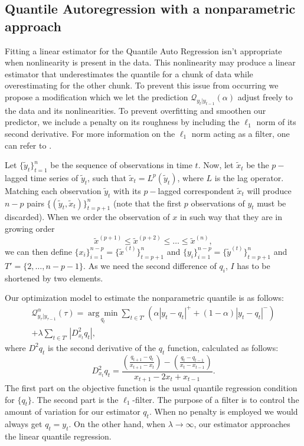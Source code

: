 \subsection{Quantile Autoregression with a nonparametric approach}
\label{sec:npqar}

Fitting a linear estimator for the Quantile Auto Regression isn't appropriate  when nonlinearity is present in the data. This nonlinearity may produce a linear estimator that underestimates the quantile for a chunk of data while overestimating for the other chunk. To prevent this issue from occurring we propose a modification which we let the prediction $\mathcal{Q}_{y_t|y_{t-1}}(\alpha)$ adjust freely to the data and its nonlinearities. To prevent overfitting and smoothen our predictor, we include a penalty on its roughness by including the $\ell_1$ norm of its second derivative. For more information on the $\ell_1$ norm acting as a filter, one can refer to \cite{kim2009ell_1}.




Let $\{\tilde{y}_t \}_{t=1}^n$ be the sequence of observations in time $t$. Now, let $\tilde{x}_t$ be the $p-$lagged time series of $\tilde{y}_t$, such that $\tilde{x}_t = L^p(\tilde{y}_t)$, where $L$ is the lag operator. Matching each observation $\tilde{y}_t$ with its $p-$lagged correspondent $\tilde{x}_t$ will produce $n-p$ pairs $\{(\tilde{y}_t,\tilde{x}_t)\}_{t=p+1}^n$ (note that the first $p$ observations of $y_t$ must be discarded). When we order the observation of $x$ in such way that they are in growing order
$$\tilde{x}^{(p+1)} \leq \tilde{x}^{(p+2)} \leq \dots \leq \tilde{x}^{(n)},$$ 
we can then define $\{x_i\}_{i=1}^{n-p} = \{\tilde{x}^{(t)} \}_{t=p+1}^{n}$ and $\{y_i\}_{i=1}^{n-p} = \{\tilde{y}^{(t)} \}_{t=p+1}^{n}$ and $T' = \{2,\dots, n-p-1\}$. As we need the second difference of $q_i$, $I$ has to be shortened by two elements.


Our optimization model to estimate the nonparametric quantile is as follows:
\begin{equation}
\begin{split}
\mathcal{Q}_{y_\tau|y_{\tau-1}}^\alpha(\tau) =\underset{q_{t}}{\arg\min}\sum_{t\in T'} \left( \alpha |y_{t}-q_{t}|^{+} + (1-\alpha)|y_{t}-q_{t}|^{-}\right) \\ +\lambda  \sum_{t\in T'}|D_{x_t}^{2}q_{t}|,
\end{split}
\end{equation}
where $D^2 q_t$ is the second derivative of the $q_t$ function, calculated as follows:
\begin{equation*}
D_{x_{t}}^{2}q_{t}=\frac{\left(\frac{q_{t+1}-q_{t}}{x_{t+1}-x_{t}}\right)-\left(\frac{q_{t}-q_{t-1}}{x_{t}-x_{t-1}}\right)}{x_{t+1}-2x_{t} + x_{t-1}}.
\end{equation*}
The first part on the objective function is the usual quantile regression condition for $\{q_t\}$. The second part is the $\ell_1$-filter. The purpose of a filter is to control the amount of variation for our estimator $q_t$. When no penalty is employed we would always get $q_t = y_t$. On the other hand, when $\lambda \rightarrow \infty$, our estimator approaches the linear quantile regression. 

